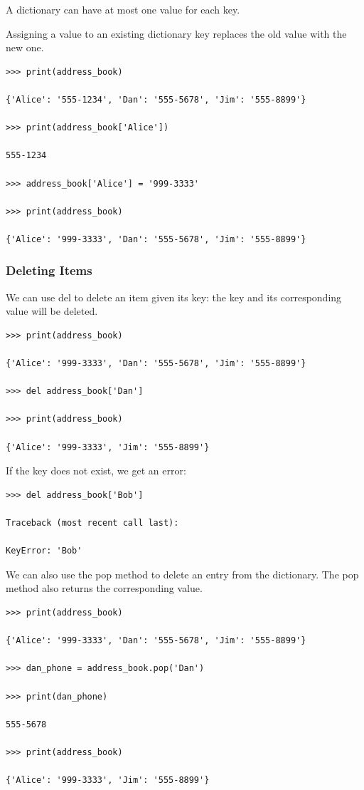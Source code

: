 \documentclass{article}
\begin{document}
A dictionary can have at most one value for each key.

Assigning a value to an existing dictionary key replaces the old value with the new one.

\begin{lstlisting}
>>> print(address_book)

{'Alice': '555-1234', 'Dan': '555-5678', 'Jim': '555-8899'}

>>> print(address_book['Alice'])

555-1234 

>>> address_book['Alice'] = '999-3333'

>>> print(address_book)

{'Alice': '999-3333', 'Dan': '555-5678', 'Jim': '555-8899'} 
\end{lstlisting}

\subsubsection{Deleting Items}

We can use del to delete an item given its key:  the key and its corresponding value will be deleted.

\begin{lstlisting}
>>> print(address_book)

{'Alice': '999-3333', 'Dan': '555-5678', 'Jim': '555-8899'}

>>> del address_book['Dan']

>>> print(address_book)

{'Alice': '999-3333', 'Jim': '555-8899'}
\end{lstlisting}

If the key does not exist, we get an error:

\begin{lstlisting}
>>> del address_book['Bob']

Traceback (most recent call last):

KeyError: 'Bob'
\end{lstlisting}

We can also use the pop method to delete an entry from the dictionary.  The pop method also returns the corresponding value.

\begin{lstlisting}
>>> print(address_book)

{'Alice': '999-3333', 'Dan': '555-5678', 'Jim': '555-8899'}

>>> dan_phone = address_book.pop('Dan')

>>> print(dan_phone)

555-5678

>>> print(address_book)

{'Alice': '999-3333', 'Jim': '555-8899'}
\end{lstlisting}
\end{document}
